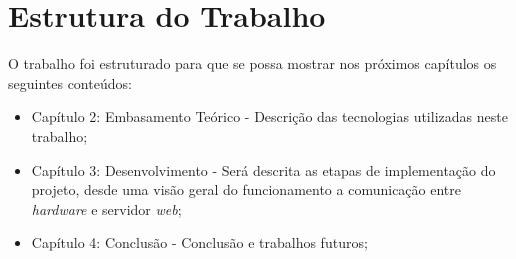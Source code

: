 \section{Estrutura do Trabalho}
O trabalho foi estruturado para que se possa mostrar nos próximos capítulos os seguintes conteúdos:
\begin{itemize}
	\item Capítulo 2: Embasamento Teórico - Descrição das tecnologias utilizadas neste trabalho;
	\item Capítulo 3: Desenvolvimento - Será descrita as etapas de implementação do projeto, desde uma visão geral do funcionamento a comunicação entre \textit{hardware} e servidor \textit{web};
	\item Capítulo 4: Conclusão - Conclusão e trabalhos futuros;
\end{itemize}